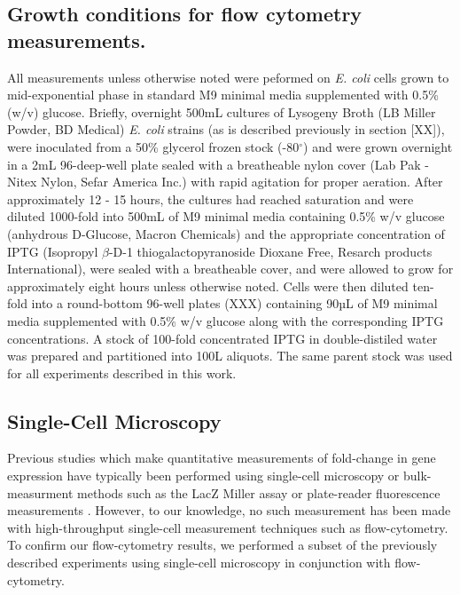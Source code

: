 \subsection*{Growth conditions for flow cytometry measurements.}
All measurements unless otherwise noted were peformed on \textit{E. coli} cells
grown to mid-exponential phase in standard M9 minimal media supplemented with
0.5\% (w/v) glucose. Briefly, overnight 500mL cultures of Lysogeny Broth (LB
Miller Powder, BD Medical) \textit{E. coli} strains (as is described previously
in section [XX]), were inoculated from a 50\% glycerol frozen stock
(-80$^\circ$) and were grown overnight in a 2mL 96-deep-well plate sealed with
a breatheable nylon cover (Lab Pak - Nitex Nylon, Sefar America Inc.) with
rapid agitation for proper aeration. After approximately 12 - 15 hours, the
cultures had reached saturation and were diluted 1000-fold into 500mL of M9
minimal media containing 0.5\% w/v glucose (anhydrous D-Glucose, Macron
Chemicals) and the appropriate concentration of IPTG (Isopropyl $\beta$-D-1
thiogalactopyranoside Dioxane Free, Resarch products International), were
sealed with a breatheable cover, and were allowed to grow for approximately
eight hours unless otherwise noted. Cells were then diluted ten-fold into a
round-bottom 96-well plates (XXX) containing 90µL of M9 minimal media
supplemented with 0.5\% w/v glucose along with the corresponding IPTG
concentrations. A stock of 100-fold concentrated IPTG in double-distiled water
was prepared and partitioned into 100\textmu L aliquots. The same parent stock
was used for all experiments described in this work.

\subsection*{Single-Cell Microscopy}
Previous studies which make quantitative measurements of fold-change  in gene
expression have typically been performed using single-cell microscopy
\cite{Brewster2014, Jones2014} or bulk-measurment  methods such as the LacZ
Miller assay or plate-reader fluorescence measurements \cite{Garcia2011,
Razo-Mejia2014}. However, to our knowledge, no such measurement has been made
with high-throughput single-cell  measurement techniques such as flow-cytometry.
To confirm our flow-cytometry results, we performed a subset of the previously
described experiments using  single-cell microscopy in conjunction with flow-
cytometry.

